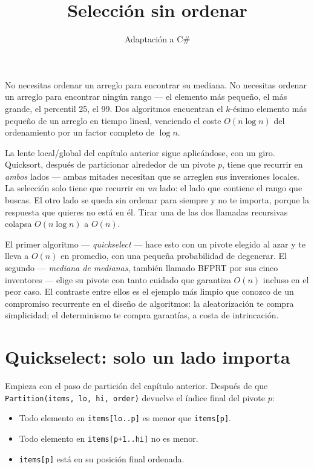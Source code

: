 \documentclass[11pt,a4paper]{article}
\title{Selección sin ordenar}
\author{Adaptación a C\#}
\date{}
\begin{document}
\maketitle

No necesitas ordenar un arreglo para encontrar su mediana. No necesitas ordenar un arreglo para encontrar ningún rango --- el elemento más pequeño, el más grande, el percentil 25, el 99. Dos algoritmos encuentran el $k$-ésimo elemento más pequeño de un arreglo en tiempo lineal, venciendo el coste $O(n \log n)$ del ordenamiento por un factor completo de $\log n$.

La lente local/global del capítulo anterior sigue aplicándose, con un giro. Quicksort, después de particionar alrededor de un pivote $p$, tiene que recurrir en \emph{ambos} lados --- ambas mitades necesitan que se arreglen sus inversiones locales. La selección solo tiene que recurrir en \emph{un} lado: el lado que contiene el rango que buscas. El otro lado se queda sin ordenar para siempre y no te importa, porque la respuesta que quieres no está en él. Tirar una de las dos llamadas recursivas colapsa $O(n \log n)$ a $O(n)$.

El primer algoritmo --- \emph{quickselect} --- hace esto con un pivote elegido al azar y te lleva a $O(n)$ en promedio, con una pequeña probabilidad de degenerar. El segundo --- \emph{mediana de medianas}, también llamado BFPRT por sus cinco inventores --- elige su pivote con tanto cuidado que garantiza $O(n)$ incluso en el peor caso. El contraste entre ellos es el ejemplo más limpio que conozco de un compromiso recurrente en el diseño de algoritmos: la aleatorización te compra simplicidad; el determinismo te compra garantías, a costa de intrincación.

\section{Quickselect: solo un lado importa}

Empieza con el paso de partición del capítulo anterior. Después de que \texttt{Partition(items, lo, hi, order)} devuelve el índice final del pivote $p$:

\begin{itemize}
\item Todo elemento en \texttt{items[lo..p]} es menor que \texttt{items[p]}.
\item Todo elemento en \texttt{items[p+1..hi]} no es menor.
\item \texttt{items[p]} está en su posición final ordenada.
\end{itemize}
\end{document}
